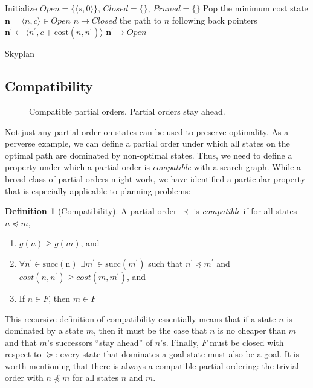 \documentclass[letterpaper]{article}
\theoremstyle{plain} \newtheorem{theorem}{Theorem} \newtheorem{proposition}{Proposition} \newtheorem{lemma}{Lemma}
\theoremstyle{definition} \newtheorem{definition}{Definition} \newtheorem{conjecture}{Conjecture} \newtheorem*{example}{Example}
\theoremstyle{remark} \newtheorem*{remark}{Remark} \newtheorem*{note}{Note} \newtheorem{case}{Case}
\begin{document}
\begin{algorithm}
  \begin{algorithmic}[1]
    \State Initialize $Open=\{\langle s,0\rangle\}$, $Closed=\{\}$, $Pruned=\{\}$
    \State Pop the minimum cost state $\mathbf{n} = \langle n,c\rangle\in Open$
      \State $n\rightarrow Closed$
        \State \Return the path to $n$ following back pointers
      \EndIf
      \State $\mathbf{n^\prime} \gets \langle n^\prime,c+\mathrm{cost}(n,n^\prime)\rangle$
        \State $\mathbf{n^\prime} \rightarrow Open$
        \EndIf
      \EndFor
    \EndWhile
  \EndProcedure
  \end{algorithmic}
\caption{Skyplan}
\label{alg:skyplan}
\end{algorithm}

\subsection{Compatibility}
\begin{figure}
  \caption{Compatible partial orders. Partial orders stay ahead.}
\end{figure}

Not just any partial order on states can be used to preserve optimality. As a perverse
example, we can define a partial order under which all states on the optimal path
are dominated by non-optimal states. Thus, we need to define a property
under which a partial order is \textit{compatible} with a search graph. While
a broad class of partial orders might work, we have identified a particular 
property that is especially applicable to planning problems:

\begin{definition}[Compatibility]
	\label{def-compatibility}
  A partial order $\prec$ is \textit{compatible} if for all states $n \preceq m$,
  \begin{enumerate}
    \item $g(n) \ge g(m)$, and 
    \item $\forall n^\prime \in \mathrm{succ(n)}$ $\exists m^\prime \in
      \mathrm{succ}(m^\prime)$ such that $n^\prime \preceq m^\prime$ and
      $cost(n,n^\prime) \ge cost(m, m^\prime)$, and
    \item If $n \in F$, then $m \in F$
  \end{enumerate}
\end{definition}
This recursive definition of compatibility essentially means that
if a state $n$ is dominated by a state $m$, then it must be the
case that $n$ is no cheaper than $m$ and that $m$'s successors
``stay ahead'' of $n$'s. Finally, $F$ must be closed with respect
to $\succeq$: every state that dominates a goal state must also be
a goal. It is worth mentioning that there is always a compatible
partial ordering: the trivial order with $n \npreceq m$ for all
states $n$ and $m$.
\end{document}
